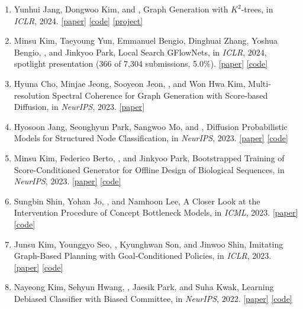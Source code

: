 \begin{enumerate}
\item Yunhui Jang, Dongwoo Kim, and , Graph Generation with $K^2$-trees, in \textit{ICLR}, 2024. \mbox{\href{https://arxiv.org/abs/2305.19125}{[paper]}} \mbox{\href{https://github.com/yunhuijang/hggt}{[code]}} \mbox{\href{https://yunhuijang.github.io/projects/HGGT/}{[project]}}
\item Minsu Kim, Taeyoung Yun, Emmanuel Bengio, Dinghuai Zhang, Yoshua Bengio, , and Jinkyoo Park, Local Search GFlowNets, in \textit{ICLR}, 2024, \textcolor{WineRed}{spotlight presentation (366 of 7,304 submissions, 5.0\%)}. \mbox{\href{https://arxiv.org/abs/2310.02710}{[paper]}} \mbox{\href{https://github.com/dbsxodud-11/ls_gfn}{[code]}}
\item Hyuna Cho, Minjae Jeong, Sooyeon Jeon, , and Won Hwa Kim, Multi-resolution Spectral Coherence for Graph Generation with Score-based Diffusion, in \textit{NeurIPS}, 2023. \mbox{\href{https://proceedings.neurips.cc/paper_files/paper/2023/hash/427f20d90386fd27804f1831d6a3d48f-Abstract-Conference.html}{[paper]}}
\item Hyosoon Jang, Seonghyun Park, Sangwoo Mo, and , Diffusion Probabilistic Models for Structured Node Classification, in \textit{NeurIPS}, 2023. \mbox{\href{https://arxiv.org/abs/2302.10506}{[paper]}} \mbox{\href{https://github.com/hsjang0/DPM-SNC}{[code]}}
\item Minsu Kim, Federico Berto, , and Jinkyoo Park, Bootstrapped Training of Score-Conditioned Generator for Offline Design of Biological Sequences, in \textit{NeurIPS}, 2023. \mbox{\href{https://arxiv.org/abs/2306.03111}{[paper]}} \mbox{\href{https://github.com/kaist-silab/bootgen}{[code]}}
\item Sungbin Shin, Yohan Jo, , and Namhoon Lee, A Closer Look at the Intervention Procedure of Concept Bottleneck Models, in \textit{ICML}, 2023. \mbox{\href{https://arxiv.org/abs/2302.14260}{[paper]}} \mbox{\href{https://github.com/ssbin4/Closer-Intervention-CBM}{[code]}}
\item Junsu Kim, Younggyo Seo, , Kyunghwan Son, and Jinwoo Shin, Imitating Graph-Based Planning with Goal-Conditioned Policies, in \textit{ICLR}, 2023. \mbox{\href{https://arxiv.org/abs/2303.11166}{[paper]}} \mbox{\href{https://github.com/junsu-kim97/PIG}{[code]}}
\item Nayeong Kim, Sehyun Hwang, , Jaesik Park, and Suha Kwak, Learning Debiased Classifier with Biased Committee, in \textit{NeurIPS}, 2022. \mbox{\href{https://arxiv.org/abs/2206.10843}{[paper]}} \mbox{\href{https://github.com/nayeong-v-kim/LWBC}{[code]}}

\end{enumerate}
